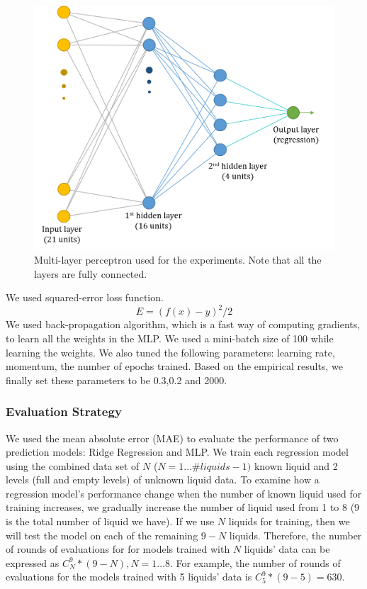 \documentclass{article} %
\begin{document}
\begin{figure}[tbh]
\centering
\includegraphics[width=0.75\linewidth]{network.png}
\caption{Multi-layer perceptron used for the experiments. Note that all the layers are fully connected.}
\label{fig:network}
\end{figure}
We used squared-error loss function.\begin{equation} E=(f(x)-y)^2/2\end{equation} We used back-propagation algorithm, which is a fast way of computing gradients, to learn all the weights in the MLP. We used a mini-batch size of 100 while learning the weights. We also tuned the following parameters: learning rate, momentum, the number of epochs trained. Based on the empirical results, we finally set these parameters to be 0.3,0.2 and 2000.


\subsubsection{Evaluation Strategy}
We used the mean absolute error (MAE) to evaluate the performance of two prediction models: Ridge Regression and MLP. We train each regression model using the combined data set of $N$ ($N = 1\dots \#liquids - 1)$ known liquid and 2 levels (full and empty levels) of unknown liquid data. To examine how a regression model's performance change when the number of known liquid used for training increases, we gradually increase the number of liquid used from 1 to 8 (9 is the total number of liquid we have). If we use $N$ liquids for training, then we will test the model on each of the remaining $9-N$ liquids. Therefore, the number of rounds of evaluations for for models trained with $N$ liquids' data can be expressed as $C_N^9 * (9-N), N = 1\dots 8$. For example, the number of rounds of evaluations for the models trained with 5 liquids' data is $C^9_5 * (9-5) = 630$.
\end{document}
